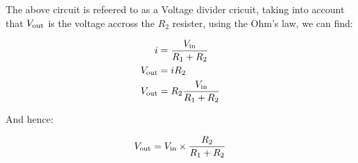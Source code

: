 \documentclass[11pt,a4paper]{book}
\begin{document}
The above circuit is refeered to as a Voltage divider cricuit, taking into account that $V_\text{out}$ is the voltage accross the $R_2$ resister, using the Ohm's law, we can find:

\begin{align*}
i &= \frac{V_\text{in}}{R_1 + R_2}\\
V_\text{out} &= i R_2\\
V_\text{out} &= R_2 \frac{V_\text{in}}{R_1 + R_2}
\end{align*}

And hence:

\begin{equation}
V_\text{out} = V_\text{in}  \times \frac{R_2}{R_1 + R_2}
\end{equation}
\end{document}
